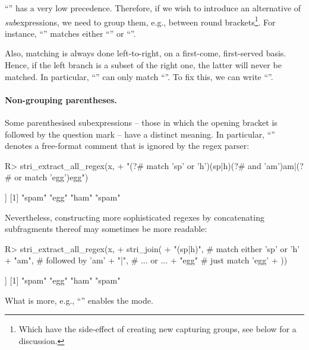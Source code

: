 \documentclass[nojss]{jss}
\begin{document}
``\code{|}'' has a very low precedence. Therefore, if we wish to
introduce an alternative of \textit{sub}expressions,
we need to group them, e.g., between round brackets\footnote{Which have
the side-effect of creating new capturing groups, see below for a discussion.}.
For instance, ``'' matches either
``'' or ``''.

Also, matching is always done left-to-right, on a first-come, first-served basis.
Hence, if the left branch is a subset of the right one, the latter will
never be matched.
In particular, ``'' can only match ``''.
To fix this, we can write ``''.


\paragraph{Non-grouping parentheses.}
Some parenthesised subexpressions -- those in which the opening bracket is followed by the question mark -- have a distinct meaning.
In particular, ``'' denotes a free-format comment
that is ignored by the regex parser:

\begin{Schunk}
\begin{Sinput}
R> stri_extract_all_regex(x,
+    "(?# match 'sp' or 'h')(sp|h)(?# and 'am')am|(?# or match 'egg')egg")
\end{Sinput}
\begin{Soutput}
[[1]]
[1] "spam" "egg"  "ham"  "spam"
\end{Soutput}
\end{Schunk}

\noindent
Nevertheless, constructing more sophisticated regexes by concatenating
subfragments thereof may sometimes be more readable:

\begin{Schunk}
\begin{Sinput}
R> stri_extract_all_regex(x,
+    stri_join(
+        "(sp|h)",   # match either 'sp' or 'h'
+        "am",       # followed by 'am'
+      "|",            # ... or ...
+        "egg"       # just match 'egg'
+  ))
\end{Sinput}
\begin{Soutput}
[[1]]
[1] "spam" "egg"  "ham"  "spam"
\end{Soutput}
\end{Schunk}


What is more, e.g., ``'' enables the 
mode.
\end{document}
